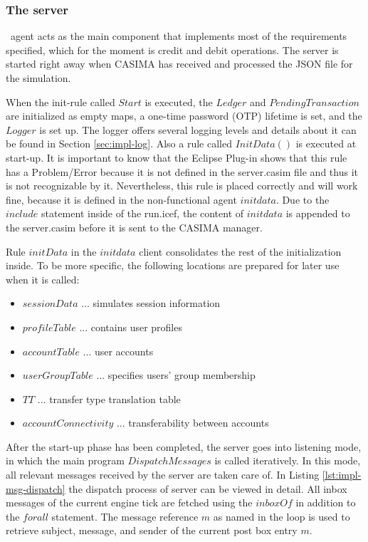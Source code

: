 \subsubsection{The server}\ agent acts as the main component that implements most of the  requirements specified, which for the moment is credit and debit operations. The server is started right away when CASIMA has received and processed the JSON file for the simulation.

When the init-rule called $Start$ is executed, the $Ledger$ and $PendingTransaction$ are initialized as empty maps, a one-time password (OTP) lifetime is set, and the $Logger$ is set up. The logger offers several logging levels and details about it can be found in Section \ref{sec:impl-log}. Also a rule called $InitData()$ is executed at start-up. It is important to know that the Eclipse Plug-in shows that this rule has a Problem/Error because it is not defined in the server.casim file and thus it is not recognizable by it. Nevertheless, this rule is placed correctly and will work fine, because it is defined in the non-functional agent $initdata$. Due to the $include$ statement inside of the run.icef, the content of $initdata$ is appended to the server.casim before it is sent to the CASIMA manager.

Rule $initData$ in the $initdata$ client consolidates the rest of the initialization inside. To be more specific, the following locations are prepared for later use when it is called:

\begin{itemize}
	\item $sessionData$ ... simulates session information
	\item $profileTable$ ... contains user profiles
	\item $accountTable$ ... user accounts
	\item $userGroupTable$ ... specifies users' group membership
	\item $TT$ ... transfer type translation table
	\item $accountConnectivity$ ... transferability between accounts
\end{itemize}

After the start-up phase has been completed, the server goes into listening mode, in which the main program $DispatchMessages$ is called iteratively. In this mode, all relevant messages received by the server are taken care of. In Listing \ref{lst:impl-msg-dispatch} the dispatch process of server can be viewed in detail. All inbox messages of the current engine tick are fetched using the $inboxOf$ in addition to the $forall$ statement. The message reference $m$ as named in the loop is used to retrieve subject, message, and sender of the current post box entry $m$.

